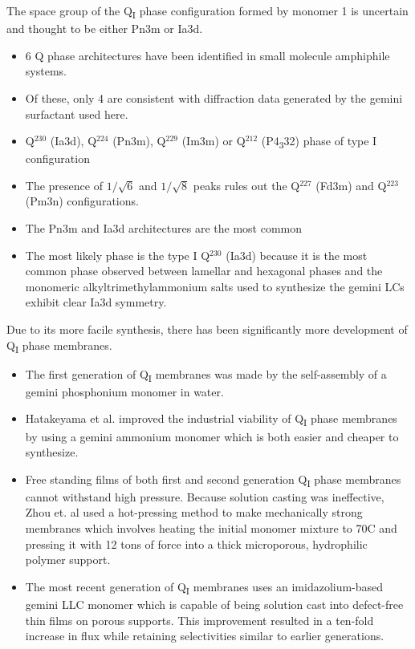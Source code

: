   The space group of the Q\textsubscript{I} phase configuration formed by
  monomer 1 is uncertain and thought to be either Pn3m or Ia3d.  %
  \begin{itemize}
    \item 6 Q phase architectures have been identified in small molecule
    amphiphile systems.~\cite{mariani_cubic_1988}
    \item Of these, only 4 are consistent with diffraction data generated
    by the gemini surfactant used here.~\cite{pindzola_cross-linked_2003}
    \item Q$^{230}$ (Ia3d), Q$^{224}$ (Pn3m), Q$^{229}$ (Im3m) or Q$^{212}$ (P4\textsubscript{3}32) phase of type I configuration
    \item The presence of $1 / \sqrt{6}$ and $1 / \sqrt{8}$ peaks rules out the
    Q$^{227}$ (Fd3m) and Q$^{223}$ (Pm3n) configurations.
    \item The Pn3m and Ia3d architectures are the most common~\cite{mariani_cubic_1988,wiesenauer_nanoporous_2012}
    \item The most likely phase is the type I Q$^{230}$ (Ia3d) because it is the
    most common phase observed between lamellar and hexagonal phases and the
    monomeric alkyltrimethylammonium salts used to synthesize the gemini LCs
    exhibit clear Ia3d symmetry.
  \end{itemize}

  Due to its more facile synthesis, there has been significantly more development
  of Q\textsubscript{I} phase membranes.
  \begin{itemize}
    \item The first generation of Q\textsubscript{I} membranes was made by 
    the self-assembly of a gemini phosphonium monomer in water.~\cite{pindzola_cross-linked_2003}
    \item Hatakeyama et al. improved the industrial viability of Q\textsubscript{I} 
    phase membranes by using a gemini ammonium monomer which is both easier and cheaper
    to synthesize.~\cite{hatakeyama_nanoporous_2010}
    \item Free standing films of both first and second generation Q\textsubscript{I} phase 
    membranes cannot withstand high pressure. Because solution casting was ineffective, Zhou
    et. al used a hot-pressing method to make mechanically strong membranes which involves 
    heating the initial monomer mixture to 70\degree C and pressing it with 12 tons of force
    into a thick microporous, hydrophilic polymer support.~\cite{zhou_new_2007}
    \item The most recent generation of Q\textsubscript{I} membranes uses an imidazolium-based
    gemini LLC monomer which is capable of being solution cast into defect-free thin films on
    porous supports. This improvement resulted in a ten-fold increase in flux while retaining
    selectivities similar to earlier generations.~\cite{carter_glycerol-based_2012}
  \end{itemize}
  
